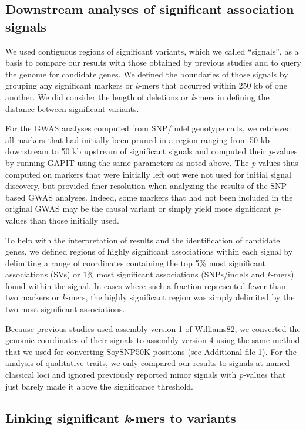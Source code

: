 \documentclass{article}
\begin{document}
\subsection*{Downstream analyses of significant association signals}

We used contiguous regions of significant variants, which we called
``signals'', as a basis to compare our results with those obtained by previous
studies and to query the genome for candidate genes. We defined the boundaries
of those signals by grouping any significant markers or \emph{k}-mers that
occurred within 250 kb of one another.  We did consider the length of deletions
or \emph{k}-mers in defining the distance between significant variants.

For the GWAS analyses computed from SNP/indel genotype calls, we retrieved all
markers that had initially been pruned in a region ranging from 50 kb
downstream to 50 kb upstream of significant signals and computed their
\emph{p}-values by running GAPIT using the same parameters as noted above. The
\emph{p}-values thus computed on markers that were initially left out were not
used for initial signal discovery, but provided finer resolution when analyzing
the results of the SNP-based GWAS analyses. Indeed, some markers that had not
been included in the original GWAS may be the causal variant or simply yield
more significant \emph{p}-values than those initially used.

To help with the interpretation of results and the identification of candidate
genes, we defined regions of highly significant associations within each signal
by delimiting a range of coordinates containing the top 5\% most significant
associations (SVs) or 1\% most significant associations (SNPs/indels
and \emph{k}-mers) found within the signal. In cases where such a fraction
represented fewer than two markers or \emph{k}-mers, the highly significant
region was simply delimited by the two most significant associations.

Because previous studies \citep{bandillo2015, bandillo2017} used assembly version 1 of
Williams82, we converted the genomic coordinates of their signals to assembly version 4
using the same method that we used for converting
SoySNP50K positions (see Additional file 1). For the analysis of
qualitative traits, we only compared our results to signals at named classical
loci and ignored previously reported minor signals with \emph{p}-values that
just barely made it above the significance threshold.

\subsection*{Linking significant \emph{k}-mers to variants}
\end{document}
